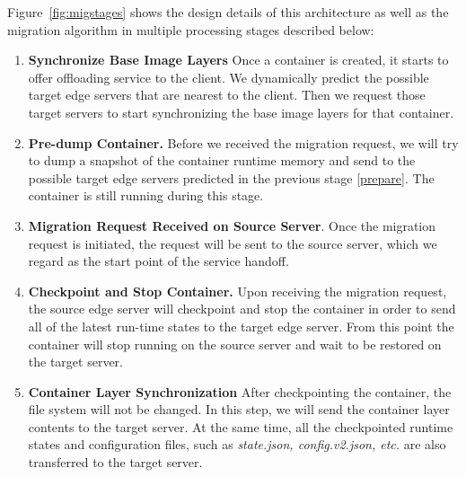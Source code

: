 


Figure~\ref{fig:migstages} shows the design details of this architecture as well as the migration algorithm in multiple processing stages described below:

\begin{enumerate}[label=\textbf{S\arabic*}]

\item \label{prepare} \textbf{%
Synchronize Base Image Layers} Once a container is created, it starts to offer offloading service to the client. We dynamically predict the possible target edge servers that are nearest to the client. Then we request those target servers to start synchronizing the base image layers for that container. 

\item \label{predump} \textbf{Pre-dump Container.} Before we received the migration request, we will try to dump a snapshot of the container runtime memory and send to the possible target edge servers predicted in the previous stage \ref{prepare}. The container is still running during this stage. %

\item \label{request}\textbf{Migration Request Received on Source Server}. Once the migration request is initiated, the request will be sent to the source server, which we regard as the start point of the service handoff.


\item \label{checkpoint} \textbf{Checkpoint and Stop Container.} Upon receiving the migration request, the source edge server will checkpoint and stop the container in order to send all of the latest run-time states to the target edge server.
From this point the container will stop running on the source server and wait to be restored on the target server.

\item \label{fs-sync} \textbf{Container Layer Synchronization} After checkpointing the container, the file system will not be changed. In this step, we will send the container layer contents to the target server. At the same time, all the checkpointed runtime states and configuration files, such as \textit{state.json, config.v2.json, etc.} are also transferred to the target server. 


\end{enumerate}
